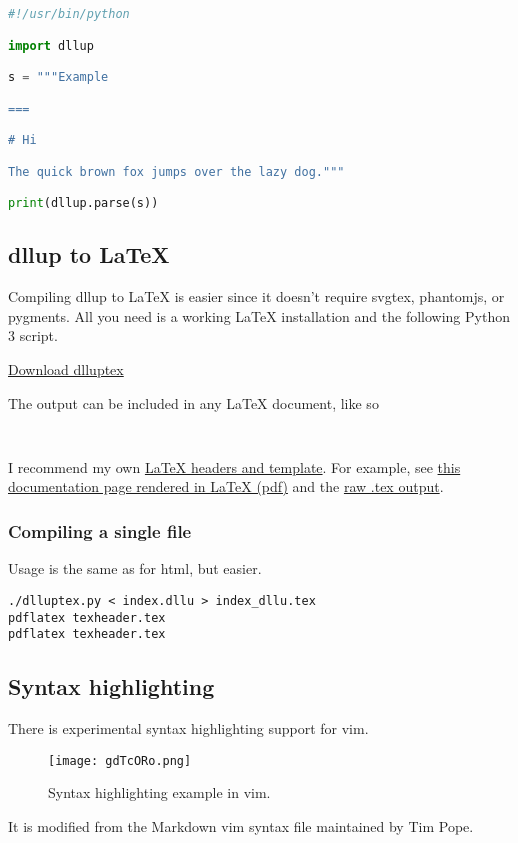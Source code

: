 \begin{lstlisting}[language=python]
#!/usr/bin/python

import dllup

s = """Example

===

# Hi

The quick brown fox jumps over the lazy dog."""

print(dllup.parse(s))
\end{lstlisting}
\subsection{dllup to LaTeX}
\label{s4.2}
Compiling dllup to LaTeX is easier since it doesn't require svgtex, phantomjs, or pygments. All you need is a working LaTeX installation and the following Python 3 script.

\begin{center}\huge \href{https://bitbucket.org/dllu/dllup/raw/master/dlluptex.py}{Download dlluptex}\end{center}
The output can be included in any LaTeX document, like so

\begin{lstlisting}[language=tex]



\end{lstlisting}
I recommend my own \href{https://bitbucket.org/dllu/dllup/raw/master/texheader.tex}{LaTeX headers and template}. For example, see \href{index.pdf}{this documentation page rendered in LaTeX (pdf)} and the \href{index_dllu.tex}{raw .tex output}.

\subsubsection{Compiling a single file}
\label{s4.2.1}
Usage is the same as for html, but easier.

\begin{lstlisting}
./dlluptex.py < index.dllu > index_dllu.tex
pdflatex texheader.tex
pdflatex texheader.tex
\end{lstlisting}
\subsection{Syntax highlighting}
\label{s4.3}
There is experimental syntax highlighting support for vim.

\begin{figure}[htb]
\centering
\texttt{[image: gdTcORo.png]}
\caption{Syntax highlighting example in vim.}
\label{fig2}
\end{figure}
It is modified from the Markdown vim syntax file maintained by Tim Pope.

